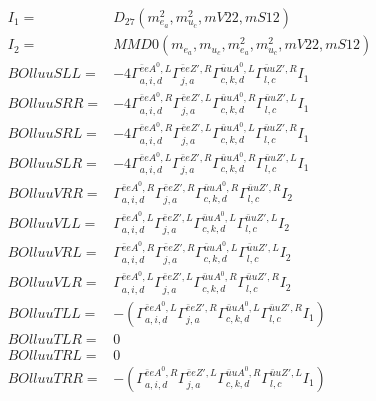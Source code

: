 \documentclass[A4,landscape]{article}
\begin{document}
\begin{align} 
I_1 = & D_{27}(m^2_{e_{{a}}}, m^2_{u_{{c}}}, mV22, mS12) \\ 
I_2 = & MMD0(m_{e_{{a}}}, m_{u_{{c}}}, m^2_{e_{{a}}}, m^2_{u_{{c}}}, mV22, mS12) \\ 
  BOlluuSLL= & -4  \Gamma^{\bar{e}e A^0 ,L}_{a, i, d} \Gamma^{\bar{e}e {Z'} ,R}_{j, a} \Gamma^{\bar{u}u A^0 ,L}_{c, k, d} \Gamma^{\bar{u}u {Z'} ,R}_{l, c} I_1 \\ 
  BOlluuSRR= & -4  \Gamma^{\bar{e}e A^0 ,R}_{a, i, d} \Gamma^{\bar{e}e {Z'} ,L}_{j, a} \Gamma^{\bar{u}u A^0 ,R}_{c, k, d} \Gamma^{\bar{u}u {Z'} ,L}_{l, c} I_1 \\ 
  BOlluuSRL= & -4  \Gamma^{\bar{e}e A^0 ,R}_{a, i, d} \Gamma^{\bar{e}e {Z'} ,L}_{j, a} \Gamma^{\bar{u}u A^0 ,L}_{c, k, d} \Gamma^{\bar{u}u {Z'} ,R}_{l, c} I_1 \\ 
  BOlluuSLR= & -4  \Gamma^{\bar{e}e A^0 ,L}_{a, i, d} \Gamma^{\bar{e}e {Z'} ,R}_{j, a} \Gamma^{\bar{u}u A^0 ,R}_{c, k, d} \Gamma^{\bar{u}u {Z'} ,L}_{l, c} I_1 \\ 
  BOlluuVRR= &  \Gamma^{\bar{e}e A^0 ,R}_{a, i, d} \Gamma^{\bar{e}e {Z'} ,R}_{j, a} \Gamma^{\bar{u}u A^0 ,R}_{c, k, d} \Gamma^{\bar{u}u {Z'} ,R}_{l, c} I_2 \\ 
  BOlluuVLL= &  \Gamma^{\bar{e}e A^0 ,L}_{a, i, d} \Gamma^{\bar{e}e {Z'} ,L}_{j, a} \Gamma^{\bar{u}u A^0 ,L}_{c, k, d} \Gamma^{\bar{u}u {Z'} ,L}_{l, c} I_2 \\ 
  BOlluuVRL= &  \Gamma^{\bar{e}e A^0 ,R}_{a, i, d} \Gamma^{\bar{e}e {Z'} ,R}_{j, a} \Gamma^{\bar{u}u A^0 ,L}_{c, k, d} \Gamma^{\bar{u}u {Z'} ,L}_{l, c} I_2 \\ 
  BOlluuVLR= &  \Gamma^{\bar{e}e A^0 ,L}_{a, i, d} \Gamma^{\bar{e}e {Z'} ,L}_{j, a} \Gamma^{\bar{u}u A^0 ,R}_{c, k, d} \Gamma^{\bar{u}u {Z'} ,R}_{l, c} I_2 \\ 
  BOlluuTLL= & -( \Gamma^{\bar{e}e A^0 ,L}_{a, i, d} \Gamma^{\bar{e}e {Z'} ,R}_{j, a} \Gamma^{\bar{u}u A^0 ,L}_{c, k, d} \Gamma^{\bar{u}u {Z'} ,R}_{l, c} I_1) \\ 
  BOlluuTLR= & 0 \\ 
  BOlluuTRL= & 0 \\ 
  BOlluuTRR= & -( \Gamma^{\bar{e}e A^0 ,R}_{a, i, d} \Gamma^{\bar{e}e {Z'} ,L}_{j, a} \Gamma^{\bar{u}u A^0 ,R}_{c, k, d} \Gamma^{\bar{u}u {Z'} ,L}_{l, c} I_1) \\ 
\end{align} 
\end{document}
